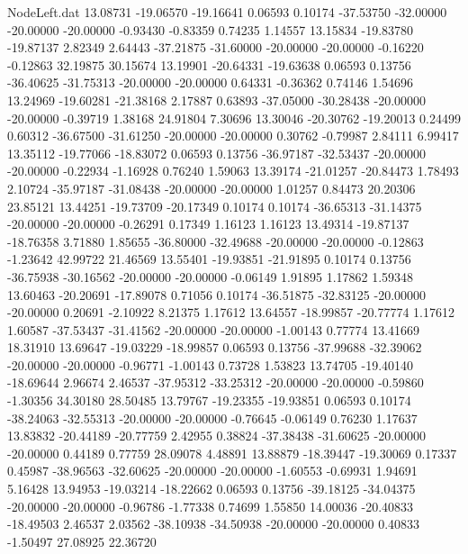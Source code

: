 \begin{filecontents}{NodeLeft.dat}
  13.08731  -19.06570  -19.16641     0.06593    0.10174  -37.53750  -32.00000  -20.00000  -20.00000   -0.93430   -0.83359    0.74235    1.14557
  13.15834  -19.83780  -19.87137     2.82349    2.64443  -37.21875  -31.60000  -20.00000  -20.00000   -0.16220   -0.12863   32.19875   30.15674
  13.19901  -20.64331  -19.63638     0.06593    0.13756  -36.40625  -31.75313  -20.00000  -20.00000    0.64331   -0.36362    0.74146    1.54696
  13.24969  -19.60281  -21.38168     2.17887    0.63893  -37.05000  -30.28438  -20.00000  -20.00000   -0.39719    1.38168   24.91804    7.30696
  13.30046  -20.30762  -19.20013     0.24499    0.60312  -36.67500  -31.61250  -20.00000  -20.00000    0.30762   -0.79987    2.84111    6.99417
  13.35112  -19.77066  -18.83072     0.06593    0.13756  -36.97187  -32.53437  -20.00000  -20.00000   -0.22934   -1.16928    0.76240    1.59063
  13.39174  -21.01257  -20.84473     1.78493    2.10724  -35.97187  -31.08438  -20.00000  -20.00000    1.01257    0.84473   20.20306   23.85121
  13.44251  -19.73709  -20.17349     0.10174    0.10174  -36.65313  -31.14375  -20.00000  -20.00000   -0.26291    0.17349    1.16123    1.16123
  13.49314  -19.87137  -18.76358     3.71880    1.85655  -36.80000  -32.49688  -20.00000  -20.00000   -0.12863   -1.23642   42.99722   21.46569
  13.55401  -19.93851  -21.91895     0.10174    0.13756  -36.75938  -30.16562  -20.00000  -20.00000   -0.06149    1.91895    1.17862    1.59348
  13.60463  -20.20691  -17.89078     0.71056    0.10174  -36.51875  -32.83125  -20.00000  -20.00000    0.20691   -2.10922    8.21375    1.17612
  13.64557  -18.99857  -20.77774     1.17612    1.60587  -37.53437  -31.41562  -20.00000  -20.00000   -1.00143    0.77774   13.41669   18.31910
  13.69647  -19.03229  -18.99857     0.06593    0.13756  -37.99688  -32.39062  -20.00000  -20.00000   -0.96771   -1.00143    0.73728    1.53823
  13.74705  -19.40140  -18.69644     2.96674    2.46537  -37.95312  -33.25312  -20.00000  -20.00000   -0.59860   -1.30356   34.30180   28.50485
  13.79767  -19.23355  -19.93851     0.06593    0.10174  -38.24063  -32.55313  -20.00000  -20.00000   -0.76645   -0.06149    0.76230    1.17637
  13.83832  -20.44189  -20.77759     2.42955    0.38824  -37.38438  -31.60625  -20.00000  -20.00000    0.44189    0.77759   28.09078    4.48891
  13.88879  -18.39447  -19.30069     0.17337    0.45987  -38.96563  -32.60625  -20.00000  -20.00000   -1.60553   -0.69931    1.94691    5.16428
  13.94953  -19.03214  -18.22662     0.06593    0.13756  -39.18125  -34.04375  -20.00000  -20.00000   -0.96786   -1.77338    0.74699    1.55850
  14.00036  -20.40833  -18.49503     2.46537    2.03562  -38.10938  -34.50938  -20.00000  -20.00000    0.40833   -1.50497   27.08925   22.36720

\end{filecontents}
